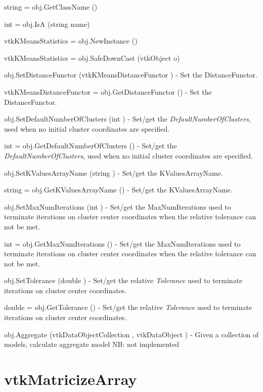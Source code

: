 \begin{DoxyItemize}
\item {\ttfamily string = obj.\-Get\-Class\-Name ()}  
\item {\ttfamily int = obj.\-Is\-A (string name)}  
\item {\ttfamily vtk\-K\-Means\-Statistics = obj.\-New\-Instance ()}  
\item {\ttfamily vtk\-K\-Means\-Statistics = obj.\-Safe\-Down\-Cast (vtk\-Object o)}  
\item {\ttfamily obj.\-Set\-Distance\-Functor (vtk\-K\-Means\-Distance\-Functor )} -\/ Set the Distance\-Functor.  
\item {\ttfamily vtk\-K\-Means\-Distance\-Functor = obj.\-Get\-Distance\-Functor ()} -\/ Set the Distance\-Functor.  
\item {\ttfamily obj.\-Set\-Default\-Number\-Of\-Clusters (int )} -\/ Set/get the {\itshape Default\-Number\-Of\-Clusters}, used when no initial cluster coordinates are specified.  
\item {\ttfamily int = obj.\-Get\-Default\-Number\-Of\-Clusters ()} -\/ Set/get the {\itshape Default\-Number\-Of\-Clusters}, used when no initial cluster coordinates are specified.  
\item {\ttfamily obj.\-Set\-K\-Values\-Array\-Name (string )} -\/ Set/get the K\-Values\-Array\-Name.  
\item {\ttfamily string = obj.\-Get\-K\-Values\-Array\-Name ()} -\/ Set/get the K\-Values\-Array\-Name.  
\item {\ttfamily obj.\-Set\-Max\-Num\-Iterations (int )} -\/ Set/get the Max\-Num\-Iterations used to terminate iterations on cluster center coordinates when the relative tolerance can not be met.  
\item {\ttfamily int = obj.\-Get\-Max\-Num\-Iterations ()} -\/ Set/get the Max\-Num\-Iterations used to terminate iterations on cluster center coordinates when the relative tolerance can not be met.  
\item {\ttfamily obj.\-Set\-Tolerance (double )} -\/ Set/get the relative {\itshape Tolerance} used to terminate iterations on cluster center coordinates.  
\item {\ttfamily double = obj.\-Get\-Tolerance ()} -\/ Set/get the relative {\itshape Tolerance} used to terminate iterations on cluster center coordinates.  
\item {\ttfamily obj.\-Aggregate (vtk\-Data\-Object\-Collection , vtk\-Data\-Object )} -\/ Given a collection of models, calculate aggregate model N\-B\-: not implemented  
\end{DoxyItemize}\hypertarget{vtkinfovis_vtkmatricizearray}{}\section{vtk\-Matricize\-Array}\label{vtkinfovis_vtkmatricizearray}
